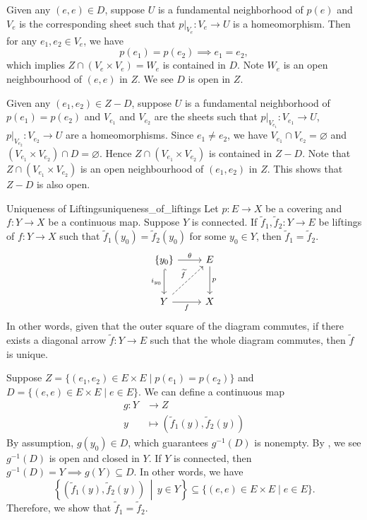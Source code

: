 \documentclass{report}
\newcommand{\midv}{\,\middle\vert\,}
\begin{document}
\begin{prf}
	Given any $(e,e)\in D$, suppose $U$ is a fundamental neighborhood of $p(e)$ and $V_e$ is the corresponding sheet such that $\left.p\right|_{V_e}:V_e\to U$ is a homeomorphism. Then for any $e_1,e_2\in V_e$, we have
	\[
		p(e_1)=p(e_2)\implies e_1=e_2,
	\]
	which implies $Z \cap\left(V_e \times V_e\right)=W_e$ is contained in $D$. Note $W_e$ is an open neighbourhood of $(e, e)$ in $Z$. We see $D$ is open in $Z$.

	Given any $(e_1,e_2)\in Z-D$, suppose $U$ is a fundamental neighborhood of $p(e_1)=p(e_2)$ and $V_{e_1}$ and $V_{e_2}$ are the sheets such that $\left.p\right|_{V_{e_1}}:V_{e_1}\to U$, $\left.p\right|_{V_{e_2}}:V_{e_2}\to U$ are a homeomorphisms. Since $e_1 \ne e_2$, we have $V_{e_1} \cap V_{e_2}=\varnothing$ and $\left(V_{e_1}\times V_{e_2}\right)\cap D=\varnothing$. Hence $Z \cap\left(V_{e_1} \times V_{e_2} \right)$  is contained in $Z-D$. Note that $Z \cap\left(V_{e_1} \times V_{e_2} \right)$ is an open neighbourhood of $(e_1,e_2)$ in $Z$. This shows that $Z- D$ is also open.
\end{prf}


\begin{proposition}{Uniqueness of Liftings}{uniqueness_of_liftings}
Let $p: E \rightarrow X$ be a covering and $f: Y \rightarrow X$ be a continuous map. Suppose $Y$ is connected. If $\widetilde{f}_1, \widetilde{f}_2: Y \rightarrow E$ be liftings of $f: Y \rightarrow X$ such that $\widetilde{f}_1(y_0)=\widetilde{f}_2(y_0)$ for some $y_0\in Y$, then $\widetilde{f}_1=\widetilde{f}_2$.
\[
	\begin{tikzcd}[ampersand replacement=\&]
		\{y_0\} \arrow[r, "\theta"] \arrow[d, "i_{y_0}"', hook]                      \& E \arrow[d, "p"] \\ [+8pt]
		Y \arrow[r, "f"'] \arrow[ru, "\widetilde{f}", dashed] \& X               
	\end{tikzcd}
	\]
	In other words, given that the outer square of the diagram commutes, if there exists a diagonal arrow $\widetilde{f}:Y\to E$ such that the whole diagram commutes, then $\widetilde{f}$ is unique.
\end{proposition}

\begin{prf}
	Suppose $Z=\{(e_1, e_2) \in E \times E \mid p(e_1)=p(e_2)\}$ and $D=\{(e, e) \in E \times E \mid e\in E\}$. We can define a continuous map
	\begin{align*}
		g: Y &\longrightarrow Z\\
		y &\longmapsto \left(\widetilde{f}_1(y), \widetilde{f}_2(y)\right)
	\end{align*}
	 By assumption, $g(y_0)\in D$, which guarantees $g^{-1}(D)$ is nonempty. By , we see $g^{-1}(D)$ is open and closed in $Y$. If $Y$ is connected, then $g^{-1}(D)=Y\implies g(Y)\subseteq D$. In other words, we have
	 \[
		\left\{\left(\widetilde{f}_1(y), \widetilde{f}_2(y)\right) \midv y \in Y\right\} \subseteq\{(e, e) \in E \times E \mid e\in E\}.
		\]
	Therefore, we show that	$\widetilde{f}_1=\widetilde{f}_2$.
\end{prf}
\end{document}
